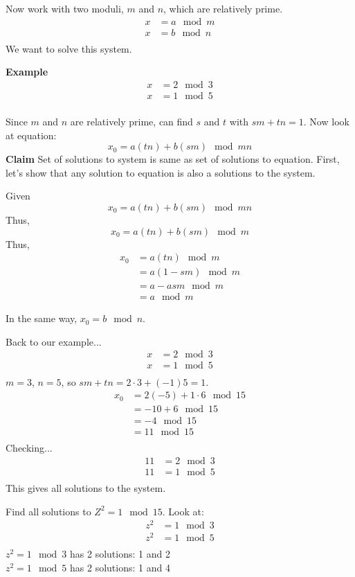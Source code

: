 Now work with two moduli, $m$ and $n$, which are relatively prime.
\begin{align*}
x & = a \mod m \\
x & = b \mod n \\
\end{align*}
We want to solve this system.

\textbf{Example}
\begin{align*}
x & = 2 \mod 3 \\
x & = 1 \mod 5 \\
\end{align*}

Since $m$ and $n$ are relatively prime, can find $s$ and $t$ with $sm + tn = 1$. Now look at equation:
\[
x_0 = a(tn) + b(sm) \mod mn
\]
\textbf{Claim} Set of solutions to system is same as set of solutions to equation. First, let's show that any solution to equation is also a solutions to the system.

Given
\[
x_0 = a(tn) + b(sm) \mod mn
\]
Thus,
\[
x_0 = a(tn) + b(sm) \mod m
\]
Thus,
\begin{align*}
x_0 & = a(tn) \mod m \\
    & = a(1-sm) \mod m \\
    & = a-asm \mod m \\
    & = a \mod m
\end{align*}

In the same way, $x_0 = b \mod n$.

Back to our example...
\begin{align*}
x & = 2 \mod 3 \\
x & = 1 \mod 5 \\
\end{align*}
$m = 3$, $n = 5$, so $sm + tn = 2 \cdot 3 + (-1)5 = 1$.
\begin{align*}
x_0 & = 2(-5) + 1 \cdot 6 \mod 15 \\
    & = -10 + 6 \mod 15 \\
    & = -4 \mod 15 \\
    & = 11 \mod 15 \\
\end{align*}
Checking...
\begin{align*}
11 & = 2 \mod 3 \\
11 & = 1 \mod 5 \\
\end{align*}
This gives all solutions to the system.

Find all solutions to $Z^2 = 1 \mod 15$. Look at:
\begin{align*}
z^2 & = 1 \mod 3 \\
z^2 & = 1 \mod 5 \\
\end{align*}
$z^2  =  1 \mod 3$ has 2 solutions: 1 and 2 \\
$z^2  =  1 \mod 5$ has 2 solutions: 1 and 4

